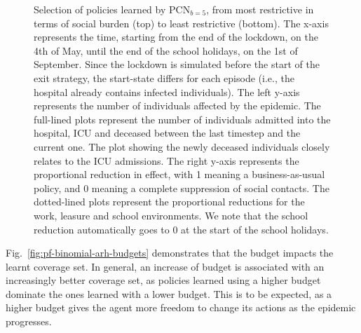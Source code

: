 \documentclass{article}
\newcommand\todo[1]{\textcolor{red}{(TODO: #1)}}
\begin{document}
\begin{figure}
    \centering
    
    \caption{Selection of policies learned by $\text{PCN}_{b=5}$, from most restrictive in terms of social burden (top) to least restrictive (bottom). The x-axis represents the time, starting from the end of the lockdown, on the 4th of May, until the end of the school holidays, on the 1st of September. Since the lockdown is simulated before the start of the exit strategy, the start-state differs for each episode (i.e., the hospital already contains infected individuals). The left y-axis represents the number of individuals affected by the epidemic. The full-lined plots represent the number of individuals admitted into the hospital, ICU and deceased between the last timestep and the current one. The plot showing the newly deceased individuals closely relates to the ICU admissions. The right y-axis represents the proportional reduction in effect, with 1 meaning a business-as-usual policy, and 0 meaning a complete suppression of social contacts. The dotted-lined plots represent the proportional reductions for the work, leasure and school environments. We note that the school reduction automatically goes to 0 at the start of the school holidays.
    }
    \label{fig:policy-execution}
\end{figure}

Fig.~\ref{fig:pf-binomial-arh-budgets} demonstrates that the budget impacts the learnt coverage set. In general, an increase of budget is associated with an increasingly better coverage set, as policies learned using a higher budget dominate the ones learned with a lower budget. This is to be expected, as a higher budget gives the agent more freedom to change its actions as the epidemic progresses. %
\end{document}
